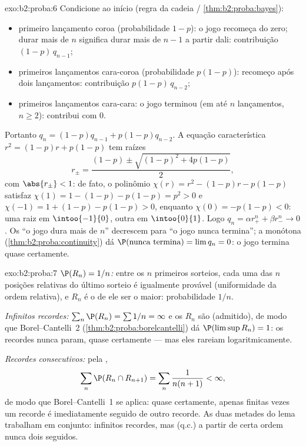 \begin{solution}{exo:b2:proba:6}
Condicione ao início (regra da cadeia /
\cref{thm:b2:proba:bayes}):
\begin{itemize}
\item primeiro lançamento coroa (probabilidade $1 - p$): o jogo recomeça
do zero; durar mais de $n$ significa durar mais de $n - 1$ a partir
dali: contribuição $(1-p)\,q_{n-1}$;
\item primeiros lançamentos cara-coroa (probabilidade $p(1-p)$): recomeço após dois
lançamentos: contribuição $p(1-p)\,q_{n-2}$;
\item primeiros lançamentos cara-cara: o jogo terminou (em até $n$ lançamentos, $n
\geq 2$): contribui com $0$.
\end{itemize}
Portanto $q_n = (1-p)q_{n-1} + p(1-p)q_{n-2}$. A equação
característica $r^2 = (1-p)r + p(1-p)$ tem raízes
\[
r_\pm = \frac{(1-p) \pm \sqrt{(1-p)^2 + 4p(1-p)}}{2},
\]
com $\abs{r_\pm} < 1$: de fato, o polinômio $\chi(r) = r^2 -
(1-p)r - p(1-p)$ satisfaz $\chi(1) = 1 - (1-p) - p(1-p) = p^2 >
0$ e $\chi(-1) = 1 + (1-p) - p(1-p) > 0$, enquanto $\chi(0) =
-p(1-p) < 0$: uma raiz em $\intoo{-1}{0}$, outra em $\intoo{0}{1}$.
Logo $q_n = \alpha r_+^n + \beta r_-^n \to 0$. Os  ``o jogo
dura mais de $n$'' decrescem para ``o jogo nunca termina''; a
 monótona (\cref{thm:b2:proba:continuity}) dá
$\P(\text{nunca termina}) = \lim q_n = 0$: o jogo termina quase
certamente.
\end{solution}

\begin{solution}{exo:b2:proba:7}
\emph{$\P(R_n) = 1/n$:} entre os $n$ primeiros sorteios, cada uma das $n$
posições relativas do último sorteio é igualmente provável (uniformidade
da ordem relativa), e $R_n$ é o  de ele ser o
maior: probabilidade $1/n$.

\emph{Infinitos recordes:} $\sum_n \P(R_n) = \sum 1/n =
\infty$ e os $R_n$ são  (admitido), de modo que
Borel--Cantelli~2 (\cref{thm:b2:proba:borelcantelli}) dá
$\P(\limsup R_n) = 1$: os recordes nunca param, quase certamente --- mas
eles rareiam logaritmicamente.

\emph{Recordes consecutivos:} pela ,
\[
\sum_n \P(R_n \cap R_{n+1})
= \sum_n \frac{1}{n(n+1)} < \infty ,
\]
de modo que Borel--Cantelli~1 se aplica: quase certamente, apenas finitas
vezes um recorde é imediatamente seguido de outro recorde. As duas
metades do lema trabalham em conjunto: infinitos recordes, mas
(q.c.) a partir de certa ordem nunca dois seguidos.
\end{solution}

